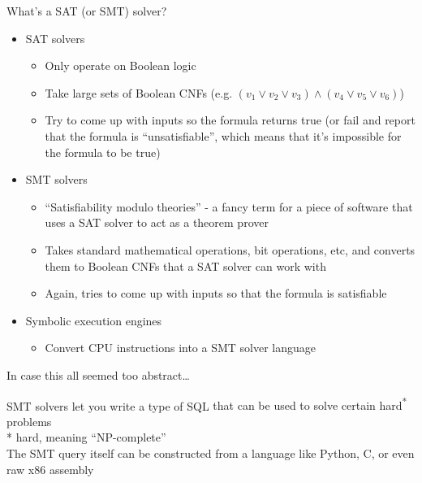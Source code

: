 \begin{frame}{What's a SAT (or SMT) solver?}
    \begin{itemize}
        \item<1-> SAT solvers
        \begin{itemize}
            \item<2-> Only operate on Boolean logic
            \item<3-> Take large sets of Boolean CNFs (e.g.
                  $(v_1 \lor v_2 \lor v_3) \land (v_4 \lor v_5 \lor v_6)$)
            \item<4-> Try to come up with inputs so the formula returns true
                  (or fail and report that the formula is ``unsatisfiable'',
                  which means that it's impossible for the formula to be true)
        \end{itemize}

        \item<5-> SMT solvers
        \begin{itemize}
            \item<6-> ``Satisfiability modulo theories'' - a fancy term for a
                      piece of software that uses a SAT solver to act as a
                      theorem prover
            \item<7-> Takes standard mathematical operations, bit operations,
                      etc, and converts them to Boolean CNFs that a SAT solver
                      can work with
            \item<8-> Again, tries to come up with inputs so that the formula
                      is satisfiable
        \end{itemize}

        \item<9-> Symbolic execution engines
        \begin{itemize}
            \item<10-> Convert CPU instructions into a SMT solver language
        \end{itemize}
    \end{itemize}
\end{frame}

\begin{frame}{In case this all seemed too abstract\ldots}
    \begin{center}
        {\Large
            SMT solvers let you write a type of SQL \alert{that
            can be used to solve certain hard\textsuperscript{*} problems}
        } \pause \\
        * hard, meaning ``NP-complete'' \pause \\
        \vspace{0.5in}
        {\Large
            The SMT query itself can be constructed from a language like
            Python, C, or even raw x86 assembly
        }
    \end{center}
\end{frame}

